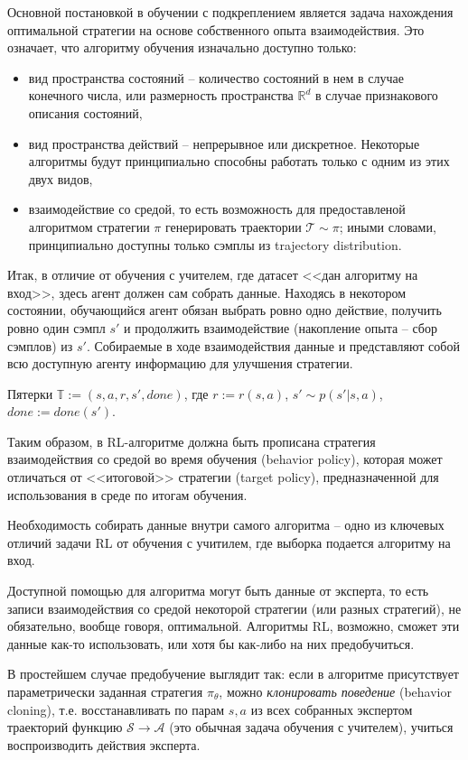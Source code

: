 \documentclass[%
	11pt,
	a4paper,
	utf8,
		]{article}
\begin{document}
Основной постановкой в обучении с подкреплением является задача нахождения оптимальной стратегии на основе собственного опыта взаимодействия. Это означает, что алгоритму обучения изначально доступно только:
\begin{itemize}
	\item вид пространства состояний -- количество состояний в нем в случае конечного числа, или размерность пространства $ \mathbb{R}^d $ в случае признакового описания состояний,
	
	\item вид пространства действий -- непрерывное или дискретное. Некоторые алгоритмы будут принципиально способны работать только с одним из этих двух видов,
	
	\item взаимодействие со средой, то есть возможность для предоставленой алгоритмом стратегии $ \pi $ генерировать траектории $ \mathcal{T} \sim \pi $; иными словами, принципиально доступны только сэмплы из trajectory distribution.
\end{itemize}

Итак, в отличие от обучения с учителем, где датасет <<дан алгоритму на вход>>, здесь агент должен сам собрать данные. Находясь в некотором состоянии, обучающийся агент обязан выбрать ровно одно действие, получить ровно один сэмпл $ s' $ и продолжить взаимодействие (накопление опыта -- сбор сэмплов) из $ s' $. Собираемые в ходе взаимодействия данные и представляют собой всю доступную агенту информацию для улучшения стратегии.

Пятерки $ \mathbb{T} := (s, a, r, s', done) $, где $ r := r(s, a) $, $ s' \sim p(s' | s, a) $, $ done := done(s') $.

Таким образом, в RL-алгоритме должна быть прописана стратегия взаимодействия со средой во время обучения (behavior policy), которая может отличаться от <<итоговой>> стратегии (target policy), предназначенной для использования в среде по итогам обучения.

Необходимость собирать данные внутри самого алгоритма -- одно из ключевых отличий задачи RL от обучения с учитилем, где выборка подается алгоритму на вход.

Доступной помощью для алгоритма могут быть данные от эксперта, то есть записи взаимодействия со средой некоторой стратегии (или разных стратегий), не обязательно, вообще говоря, оптимальной. Алгоритмы RL, возможно, сможет эти данные как-то использовать, или хотя бы как-либо на них предобучиться.

В простейшем случае предобучение выглядит так: если в алгоритме присутствует параметрически заданная стратегия $ \pi_{\theta} $, можно \emph{клонировать поведение} (behavior cloning), т.е. восстанавливать по парам $ s, a $ из всех собранных экспертом траекторий функцию $ \mathcal{S} \rightarrow \mathcal{A} $ (это обычная задача обучения с учителем), учиться воспроизводить действия эксперта.
\end{document}
